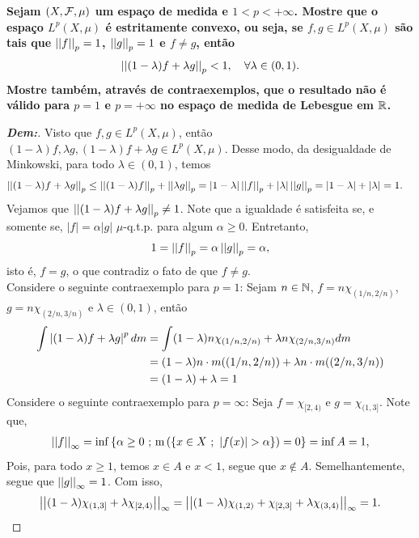 \textbf{Sejam $(X, \mcal F, \mu)$ um espaço de medida e $1 < p < +\infty$. 
Mostre que o espaço $L^p(X, \mu)$ é estritamente convexo, ou seja, 
se $f, g \in L^p(X, \mu)$ são tais que $\pnorm p f = 1$, $\pnorm p g = 1$ e 
$f \neq g$, então 
\begin{align*}
  \pnorm p {(1-\lambda)f + \lambda g}< 1, \quad \forall \lambda \in (0, 1).
\end{align*}
Mostre também, através de contraexemplos, que o resultado não é válido 
para $p=1$ e $p = +\infty$ no espaço de medida de Lebesgue em $\bR$.}
\begin{proof}[\textbf{Dem:}] Visto que 
  $f, g \in L^p(X, \mu)$, então 
  $(1 - \lambda)f, \lambda g, (1-\lambda)f + \lambda g \in L^p(X, \mu)$.
  Desse modo, da desigualdade de Minkowski, para todo $\lambda \in (0, 1)$, temos
  \begin{align*}
    \pnorm p {(1-\lambda)f + \lambda g} &\le \pnorm p {(1-\lambda) f} + \pnorm p {\lambda g}
    = \mparth{1 - \lambda} \pnorm p f + \mparth{\lambda} \pnorm p g
    = \mparth{1 - \lambda} + \mparth{\lambda} = 1. 
  \end{align*}
  Vejamos que $\pnorm p {(1 - \lambda) f + \lambda g} \neq 1$. Note que a igualdade
  é satisfeita se, e somente se, $|f| = \alpha |g|$ $\mu$-q.t.p. para algum  $\alpha \ge 0$. 
  Entretanto, 
  \begin{align*}
    1 = \pnorm p f = \alpha \pnorm p g = \alpha,
  \end{align*}
  isto é, $f = g$, o que contradiz o fato de que $f \neq g$.\\
  Considere o seguinte contraexemplo para $p=1$: Sejam $n \in \bN$, 
  $f = n \chi_{(1/n, 2/n)}$, $g = n \chi_{(2/n, 3/n)}$ 
  e $\lambda \in (0 , 1)$, então
  \begin{align*}
    \int \mparth{(1- \lambda) f + \lambda g}^p dm 
    &= \int (1-\lambda) n \chi_{(1/n, 2/n)} + \lambda n\chi_{(2/n, 3/n)} dm\\ 
    &= (1-\lambda) n \cdot m((1/n, 2/n)) + \lambda n \cdot m((2/n, 3/n))\\ 
    &= (1 - \lambda) + \lambda = 1
  \end{align*}
  Considere o seguinte contraexemplo para $p = \infty$: Seja $f=\chi_{[2, 4)}$
  e $g = \chi_{(1, 3]}$. Note que, 
  \begin{align*}
    \pnorm \infty f = \inf \set{\alpha\ge 0 \st 
    \m\parth{\set{x \in X \st \mparth{f(x)} > \alpha}} = 0} = \inf A = 1,
  \end{align*}
  Pois, para todo $x \ge 1$, temos $x \in A$ e $x < 1$, segue que $x \not \in A$. 
  Semelhantemente, segue que $\pnorm \infty g = 1$. Com isso, 
  \begin{align*}
    \pnorm \infty {(1-\lambda) \chi_{(1, 3]}+ \lambda \chi_{[2, 4)}} 
    = \pnorm \infty { (1-\lambda)\chi_{(1, 2)} + \chi_{[2, 3]} + \lambda \chi_{(3, 4)}} = 1.
  \end{align*}
\end{proof}

